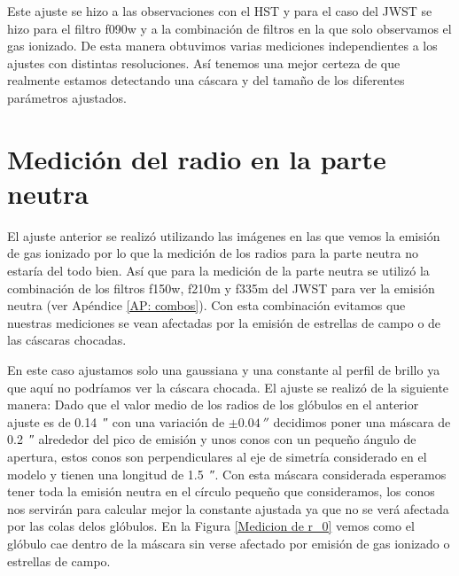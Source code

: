 \documentclass{book}
\begin{document}
Este ajuste se hizo a las observaciones con el HST y para el caso del
JWST se hizo para el filtro f090w y a la combinación de filtros en la
que solo observamos el gas ionizado. De esta manera obtuvimos varias
mediciones independientes a los ajustes con distintas resoluciones.
Así tenemos una mejor certeza de que realmente estamos detectando una
cáscara y del tamaño de los diferentes parámetros ajustados.

\section{Medición del radio en la parte neutra} \label{Sec : radio neutro}

El ajuste anterior se realizó utilizando las imágenes en las que vemos
la emisión de gas ionizado por lo que la medición de los radios para
la parte neutra no estaría del todo bien. Así que para la medición de
la parte neutra se utilizó la combinación de los filtros f150w, f210m
y f335m del JWST para ver la emisión neutra (ver Apéndice \ref{AP:
  combos}). Con esta combinación evitamos que nuestras mediciones se
vean afectadas por la emisión de estrellas de campo o de las cáscaras
chocadas.

En este caso ajustamos solo una gaussiana y una constante al perfil de
brillo ya que aquí no podríamos ver la cáscara chocada. El ajuste se
realizó de la siguiente manera: Dado que el valor medio de los radios
de los glóbulos en el anterior ajuste es de \SI{0.14}{\arcsecond} con
una variación de $\pm\SI{0.04}{\arcsecond}$ decidimos poner una máscara
de \SI{0.2}{\arcsecond} alrededor del pico de emisión y unos conos con
un pequeño ángulo de apertura, estos conos son perpendiculares al eje
de simetría considerado en el modelo y tienen una longitud de
\SI{1.5}{\arcsecond}. Con esta máscara considerada esperamos tener
toda la emisión neutra en el círculo pequeño que consideramos, los
conos nos servirán para calcular mejor la constante ajustada ya que no
se verá afectada por las colas delos glóbulos. En la Figura
\ref{Medicion de r_0} vemos como el glóbulo cae dentro de la máscara
sin verse afectado por emisión de gas ionizado o estrellas de campo.
\end{document}
